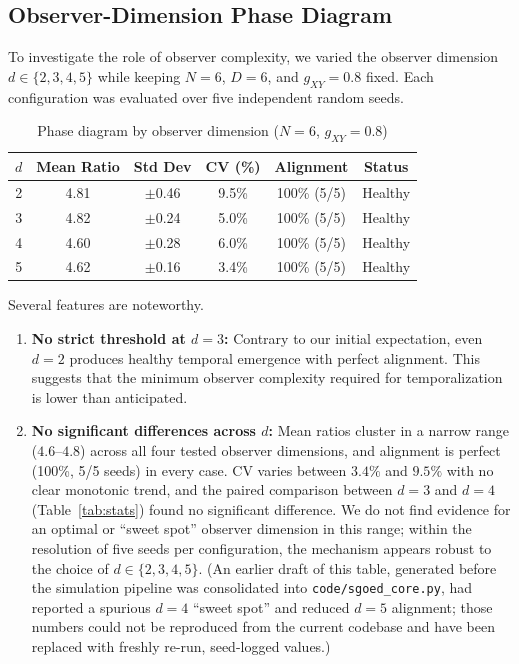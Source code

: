 \documentclass[12pt,a4paper]{article}
\begin{document}
\subsection{Observer-Dimension Phase Diagram}\label{sec:phase_diagram}

To investigate the role of observer complexity, we varied the observer
dimension $d \in \{2,3,4,5\}$ while keeping $N=6$, $D=6$, and
$g_{XY}=0.8$ fixed. Each configuration was evaluated over five independent
random seeds.

\begin{table}[ht]
\centering
\caption{Phase diagram by observer dimension ($N=6$, $g_{XY}=0.8$)}
\label{tab:phase_diagram}
\begin{tabular}{cccccc}
\toprule
$d$ & Mean Ratio & Std Dev & CV (\%) & Alignment & Status \\
\midrule
2 & 4.81 & $\pm$0.46 & 9.5\% & 100\% (5/5) & Healthy \\
3 & 4.82 & $\pm$0.24 & 5.0\% & 100\% (5/5) & Healthy \\
4 & 4.60 & $\pm$0.28 & 6.0\% & 100\% (5/5) & Healthy \\
5 & 4.62 & $\pm$0.16 & 3.4\% & 100\% (5/5) & Healthy \\
\bottomrule
\end{tabular}
\end{table}

Several features are noteworthy.

\begin{enumerate}[leftmargin=*]
\item \textbf{No strict threshold at $d=3$:}
Contrary to our initial expectation, even $d=2$ produces healthy temporal
emergence with perfect alignment. This suggests that the minimum observer
complexity required for temporalization is lower than anticipated.

\item \textbf{No significant differences across $d$:}
Mean ratios cluster in a narrow range ($4.6$--$4.8$) across all four tested
observer dimensions, and alignment is perfect (100\%, 5/5 seeds) in every
case. CV varies between $3.4\%$ and $9.5\%$ with no clear monotonic trend,
and the paired comparison between $d=3$ and $d=4$ (Table~\ref{tab:stats})
found no significant difference. We do not find evidence for an optimal or
``sweet spot'' observer dimension in this range; within the resolution of
five seeds per configuration, the mechanism appears robust to the choice of
$d \in \{2,3,4,5\}$. (An earlier draft of this table, generated before the
simulation pipeline was consolidated into \texttt{code/sgoed\_core.py}, had
reported a spurious $d=4$ ``sweet spot'' and reduced $d=5$ alignment; those
numbers could not be reproduced from the current codebase and have been
replaced with freshly re-run, seed-logged values.)
\end{enumerate}
\end{document}
